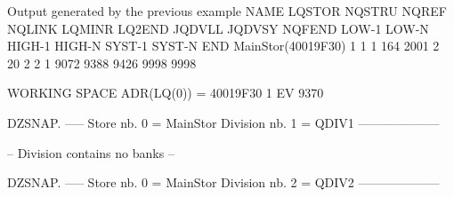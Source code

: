 \begin{landscapebody}
\begin{XMPt}{Output generated by the previous example}
  NAME       LQSTOR NQSTRU  NQREF NQLINK LQMINR LQ2END JQDVLL JQDVSY NQFEND  LOW-1  LOW-N HIGH-1 HIGH-N SYST-1 SYST-N    END     
 MainStor(40019F30)      1      1      1    164   2001      2     20      2      2      1   9072   9388   9426   9998   9998     
                                                                                                                                 
 WORKING SPACE   ADR(LQ(0)) = 40019F30                                                                                           
          1    EV        9370                                                                                                    
                                                                                                                                 
DZSNAP.   -----  Store nb. 0 = MainStor Division nb. 1 = QDIV1                       --------------------                        
                                                                                                                                 
         -- Division contains no banks --                                                                                        
                                                                                                                                 
DZSNAP.   -----  Store nb. 0 = MainStor Division nb. 2 = QDIV2                       --------------------                        
                                                                                                                                 

\end{XMPt}
\end{landscapebody}

